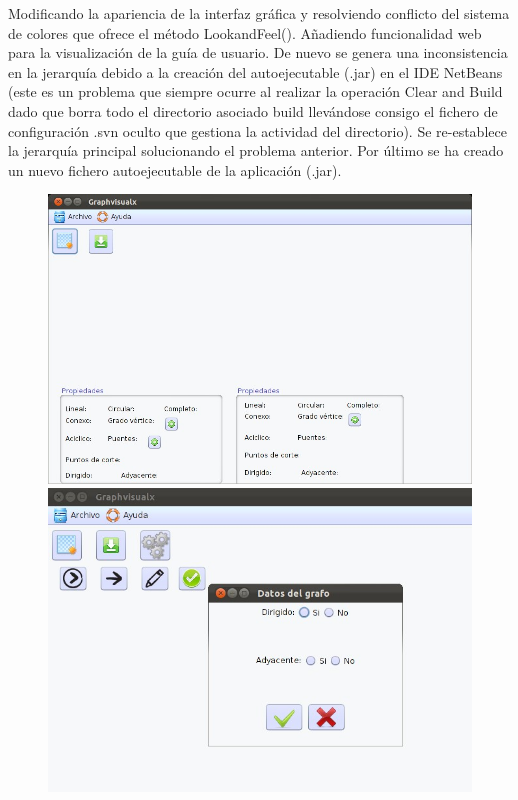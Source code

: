 \begin{itemize}
Modificando la apariencia de la interfaz gráfica y resolviendo conflicto del sistema de colores que ofrece el método LookandFeel(). Añadiendo funcionalidad web para la visualización de la guía de usuario. De nuevo se genera una inconsistencia en la jerarquía debido a la creación del autoejecutable (.jar) en el IDE NetBeans (este es un problema que siempre ocurre al realizar la operación Clear and Build dado que borra todo el directorio asociado build llevándose consigo el fichero de configuración .svn oculto que gestiona la actividad del directorio). Se re-establece la jerarquía principal solucionando el problema anterior. Por último se ha creado un nuevo fichero autoejecutable de la aplicación (.jar). 
\begin{figure}[H]
\begin{center}
\includegraphics[width=14cm]{./imagenes_documentacion/Graphvisualx_13_11_2011/captura_1.jpeg}
\includegraphics[width=14cm]{./imagenes_documentacion/Graphvisualx_13_11_2011/captura_2.jpeg}

\end{center}
\end{figure}
\end{itemize}
